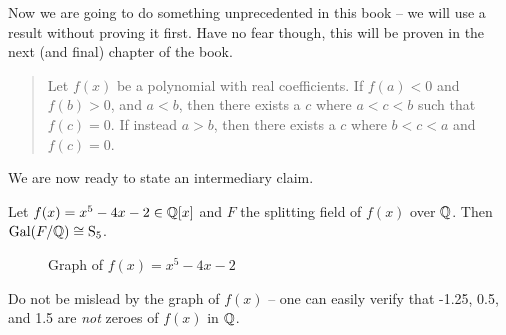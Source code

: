 Now we are going to do something unprecedented in this book -- we will use a result without proving it first. Have no fear though, this will be proven in the next (and final) chapter of the book.
\begin{quote}
    Let $f(x)$ be a polynomial with real coefficients. If $f(a) < 0$ and $f(b) > 0$, and $a < b$, then there exists a $c$ where $a < c < b$ such that $f(c) = 0$. If instead $a > b$, then there exists a $c$ where $b < c < a$ and $f(c) = 0$.
\end{quote}

We are now ready to state an intermediary claim.

\begin{proposition}
    Let $f(x) = x^5 - 4x - 2 \in \mathbb{Q}[x]$ and $F$ the splitting field of $f(x)$ over $\mathbb{Q}$. Then $\mathrm{Gal}(F/\mathbb{Q}) \cong \mathrm{S}_{5}$.
\end{proposition}

\begin{figure}[H]
    \centering
    \caption{Graph of $f(x) = x^5 - 4x - 2$}
\end{figure}

Do not be mislead by the graph of $f(x)$ -- one can easily verify that -1.25, 0.5, and 1.5 are \textit{not} zeroes of $f(x)$ in $\mathbb{Q}$.

